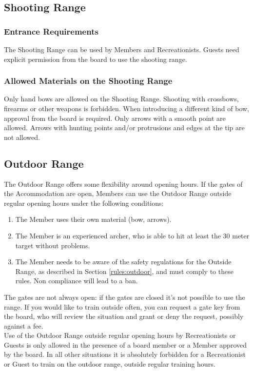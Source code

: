 \documentclass[a4paper]{article}
\begin{document}
\subsection{Shooting Range}
\subsubsection{Entrance Requirements}
The Shooting Range can be used by Members and Recreationists. Guests need explicit permission from the board to use the shooting range. 

\subsubsection{Allowed Materials on the Shooting Range}
Only hand bows are allowed on the Shooting Range. Shooting with crossbows, firearms or other weapons is forbidden. When introducing a different kind of bow, approval from the board is required. Only arrows with a smooth point are allowed. Arrows with hunting points and/or protrusions and edges at the tip are not allowed.

\subsection{Outdoor Range}
The Outdoor Range offers some flexibility around opening hours. If the gates of the Accommodation are open, Members can use the Outdoor Range outside regular opening hours under the following conditions:

\begin{enumerate}
\item The Member uses their own material (bow, arrows).
\item The Member is an experienced archer, who is able to hit at least the 30 meter target without problems.
\item The Member needs to be aware of the safety regulations for the Outside Range, as described in Section \ref{rules:outdoor}, and must comply to these rules. Non compliance will lead to a ban.
\end{enumerate}

The gates are not always open: if the gates are closed it’s not possible to use the range. If you would like to train outside often, you can request a gate key from the board, who will review the situation and grant or deny the request, possibly against a fee. \\

Use of the Outdoor Range outside regular opening hours by Recreationists or Guests is only allowed in the presence of a  board member or a Member approved by the board. In all other situations it is absolutely forbidden for a Recreationist or Guest to train on the outdoor range, outside regular training hours. 
\end{document}
